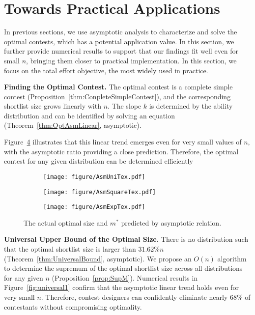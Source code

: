 \section{Towards Practical Applications}\label{sec:practicalApp}

In previous sections, we use asymptotic analysis to characterize and solve the optimal contests, which has a potential application value. In this section, we further provide numerical results to support that our findings fit well even for small $n$, bringing them closer to practical implementation.
In this section, we focus on the total effort objective, the most widely used in practice.

\noindent \textbf{Finding the Optimal Contest.} The optimal contest is a complete simple contest (Proposition~\ref{thm:ConpleteSimpleContest}), and the corresponding shortlist size grows linearly with  $n$. The slope $k$ is determined by the ability distribution and can be identified by solving an equation (Theorem~\ref{thm:OptAsmLinear}, asymptotic).

Figure~\ref{fig:DistributionOpt} illustrates that this linear trend emerges even for very small values of  $n$, with the asymptotic ratio providing a close prediction. Therefore, the optimal contest for any given distribution can be determined efficiently

\begin{figure}[htb]
\centering
\begin{subfigure}[ht]{0.30\textwidth}
    \centering
    \texttt{[image: figure/AsmUniTex.pdf]}
    \label{fig:disopt-a}
    \end{subfigure}
\begin{subfigure}[ht]{0.30\textwidth}
    \centering
    \texttt{[image: figure/AsmSquareTex.pdf]}
    \label{fig:disopt-b}
    \end{subfigure}
\begin{subfigure}[ht]{0.30\textwidth}
    \centering
    \texttt{[image: figure/AsmExpTex.pdf]}
    \label{fig:disopt-c}
    \end{subfigure}

\caption{The actual optimal size and $m^*$ predicted by asymptotic relation.}
\label{fig:DistributionOpt}
\end{figure}
\noindent \textbf{Universal Upper Bound of the Optimal Size.} There is no distribution such that the optimal shortlist size is larger than $31.62\%n$ (Theorem~\ref{thm:UniversalBound}, asymptotic).
We propose an $O(n)$ algorithm to determine the supremum of the optimal shortlist size across all distributions for any given $n$ (Proposition~\ref{prop:SupM}). Numerical results in Figure~\ref{fig:universal1} confirm that the asymptotic linear trend holds even for very small $n$. Therefore, contest designers can confidently eliminate nearly 68\% of contestants without compromising optimality.


